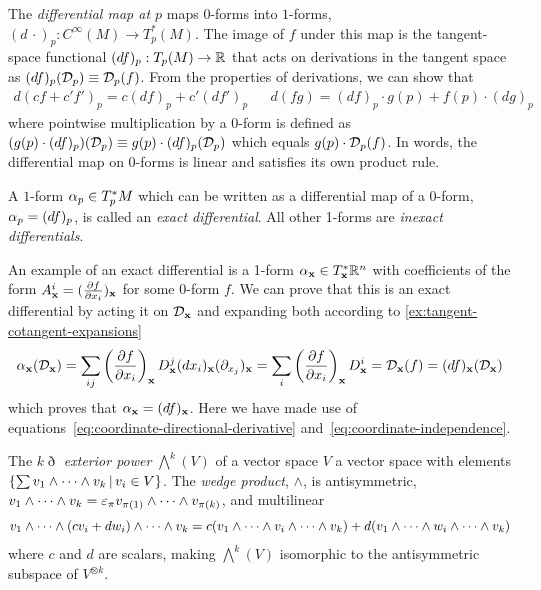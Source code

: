 \documentclass[11pt]{article}
\numberwithin{equation}{section}
\begin{document}
\begin{dfn}
\label{eq:differential-map-on-0-forms}
The \textit{differential map at $p$} maps $0$-forms into $1$-forms, $(d\,\cdot)_p:C^\infty(M)\rightarrow T_p^*(M)$.
The image of $f$ under this map is the tangent-space functional $(df)_p:T_p(M)\rightarrow\mathbb{R}$ that acts on derivations in the tangent space as $(df)_p(\mathcal{D}_p)\equiv\mathcal{D}_p(f)$.
From the properties of derivations, we can show that
\begin{align}
  d(cf + c'f')_p
=
  c(df)_p
+
  c'(df')_p
&&
  d(fg)
=
  (df)_p\cdot g(p)
+
  f(p)\cdot (dg)_p
\end{align}
where pointwise multiplication by a 0-form is defined as $(g(p)\cdot(df)_p)(\mathcal{D}_p)\equiv g(p)\cdot(df)_p(\mathcal{D}_p)$ which equals $g(p)\cdot\mathcal{D}_p(f)$.
In words, the differential map on 0-forms is linear and satisfies its own product rule.
\end{dfn}

\begin{dfn}
\label{eq:exact-differential}
A $1$-form $\alpha _p\in T_p^*M$ which can be written as a differential map of a 0-form, $\alpha _p=(df)_p$, is called an \textit{exact differential}.
All other 1-forms are \textit{inexact differentials}.
\end{dfn}

\begin{ex}
An example of an exact differential is a 1-form $\alpha _{\mathbf{x}}\in T_{\mathbf{x}}^*\mathbb{R}^n$ with coefficients of the form $A_{\mathbf{x}}^i=(\frac {\partial f}{\partial x_i})_{\mathbf{x}}$ for some 0-form $f$.
We can prove that this is an exact differential by acting it on $\mathcal{D}_{\mathbf{x}}$ and expanding both according to \cref{ex:tangent-cotangent-expansions}
\begin{align}
  \alpha _{\mathbf{x}}(\mathcal{D}_{\mathbf{x}})
=
  \sum_{ij}
  \left(\frac {\partial f}{\partial x_i}\right)_{\mathbf{x}}
  D_{\mathbf{x}}^j
  (dx_i)_{\mathbf{x}}(\partial_{x_j})_{\mathbf{x}}
=
  \sum_i
  \left(\frac {\partial f}{\partial x_i}\right)_{\mathbf{x}}
  D_{\mathbf{x}}^i
=
  \mathcal{D}_{\mathbf{x}}(f)
=
  (df)_{\mathbf{x}}(\mathcal{D}_{\mathbf{x}})
\end{align}
which proves that
$
  \alpha _{\mathbf{x}}
=
  (df)_{\mathbf{x}}
$.
Here we have made use of equations~\ref{eq:coordinate-directional-derivative} and~\ref{eq:coordinate-independence}.
\end{ex}


\begin{samepage}
\begin{dfn}
The \textit{$k\eth$ exterior power} $\bigwedge^k(V)$ of a vector space $V$ a vector space with elements $\{\sum v_1\wedge\cdots\wedge v_k\,|\,v_i\in V\}$.
The \textit{wedge product}, $\wedge$, is antisymmetric, 
$
  v_1\wedge\cd\wedge v_k
=
  \e_\pi
  v_{\pi(1)}\wedge\cd\wedge v_{\pi(k)}
$,
and multilinear
\begin{align}
  v_1\wedge\cdots \wedge(cv_i + d w_i)\wedge\cdots\wedge v_k
= 
  c(
  v_1\wedge\cdots \wedge v_i\wedge\cdots\wedge v_k
  )
+
  d(
  v_1\wedge\cdots \wedge w_i\wedge\cdots\wedge v_k
  )
\end{align}
where $c$ and $d$ are scalars, making $\bigwedge^k(V)$ isomorphic to the antisymmetric subspace of $V^{\otimes k}$.
\end{dfn}
\end{samepage}
\end{document}
